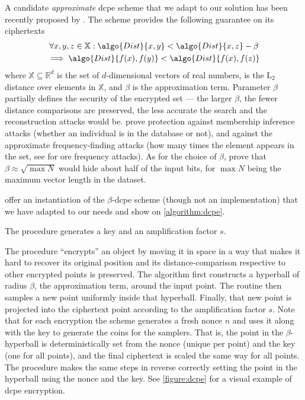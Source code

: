 			A candidate \emph{approximate} \acrshort{dcpe} scheme that we adapt to our solution has been recently proposed by \textcite{dcpe}.
			The scheme provides the following guarantee on its ciphertexts
			\begin{multline*}
				\forall x, y, z \in \mathbb{X} : \algo{Dist}{x, y} < \algo{Dist}{x, z} - \beta \\
				\implies \algo{Dist}{f(x), f(y)} < \algo{Dist}{f(x), f(z)}
			\end{multline*}
			where $\mathbb{X} \subseteq \mathbb{R}^d$ is the set of $d$-dimensional vectors of real numbers,  is the $\text{L}_2$ distance over elements in $\mathbb{X}$, and $\beta$ is the approximation term.
			Parameter $\beta$ partially defines the security of the encrypted set --- the larger $\beta$, the fewer distance comparisons are preserved, the less accurate the search and the reconstruction attacks would be.
			\textcite{dcpe} prove protection against membership inference attacks \cite{memebership-inference-attacks-knn} (whether an individual is in the database or not), and against the approximate frequency-finding attacks (how many times the element appears in the set, see \cite{leakage-abuse-grubs-2017} for \acrshort{ore} frequency attacks).
			As for the choice of $\beta$, \textcite{dcpe} prove that $\beta \approx \sqrt{\max N}$ would hide about half of the input bits, for $\max N$ being the maximum vector length in the dataset.

			

			\textcite{dcpe} offer an instantiation of the $\beta$-\acrshort{dcpe} scheme (though not an implementation) that we have adapted to our needs and show on \cref{algorithm:dcpe}.

			The  procedure generates a key \key{} and an amplification factor $s$.

			The  procedure ``encrypts'' an object by moving it in space in a way that makes it hard to recover its original position and its distance-comparison respective to other encrypted points is preserved.
			The algorithm first constructs a hyperball of radius $\beta$, the approximation term, around the input point.
			The routine then samples a new point uniformly inside that hyperball.
			Finally, that new point is projected into the ciphertext point according to the amplification factor $s$.
			Note that for each encryption the scheme generates a fresh nonce $n$ and uses it along with the key \key{} to generate the coins for the samplers.
			That is, the point in the $\beta$-hyperball is deterministically set from the nonce (unique per point) and the key (one for all points), and the final ciphertext is scaled the same way for all points.
			The  procedure makes the same steps in reverse correctly setting the point in the hyperball using the nonce and the key.
			See \cref{figure:dcpe} for a visual example of \acrshort{dcpe} encryption.


